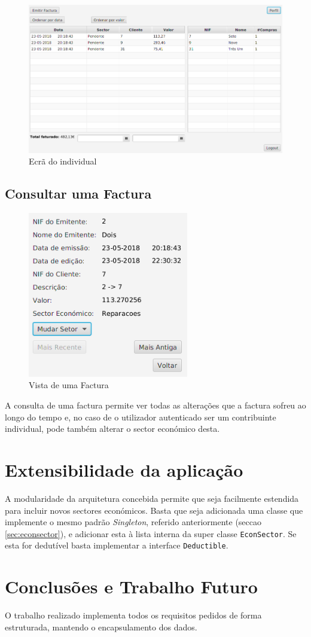 \documentclass[12pt,a4paper]{report}
\begin{document}
\begin{figure}[h]
    \centering
    \includegraphics[width=\textwidth]{./images/empresaScreen.png}
    \caption{Ecrã do individual}
    \label{fig:individual}
\end{figure}

    \section{Consultar uma Factura}
    \label{sec:viewFactura}
\begin{figure}
    \centering
    \includegraphics[width=7cm]{./images/facturaView.png}
    \caption{Vista de uma Factura}
    \label{fig:viewFactura}
\end{figure}
    A consulta de uma factura permite ver todas as alterações que a factura
    sofreu ao longo do tempo e, no caso de o utilizador autenticado ser
    um contribuinte individual, pode também alterar o sector económico desta.

\chapter{Extensibilidade da aplicação}
    A modularidade da arquitetura concebida permite que seja facilmente
    estendida para incluir novos sectores económicos. Basta que seja
    adicionada uma classe que implemente o mesmo padrão \textit{Singleton},
    referido anteriormente (seccao \ref{sec:econsector}), e adicionar esta à lista
    interna da super classe \texttt{EconSector}. Se esta for dedutível
    basta implementar a interface \texttt{Deductible}.

\chapter{Conclusões e Trabalho Futuro}
    O trabalho realizado implementa todos os requisitos
    pedidos de forma estruturada, mantendo o encapsulamento dos dados.
\end{document}
